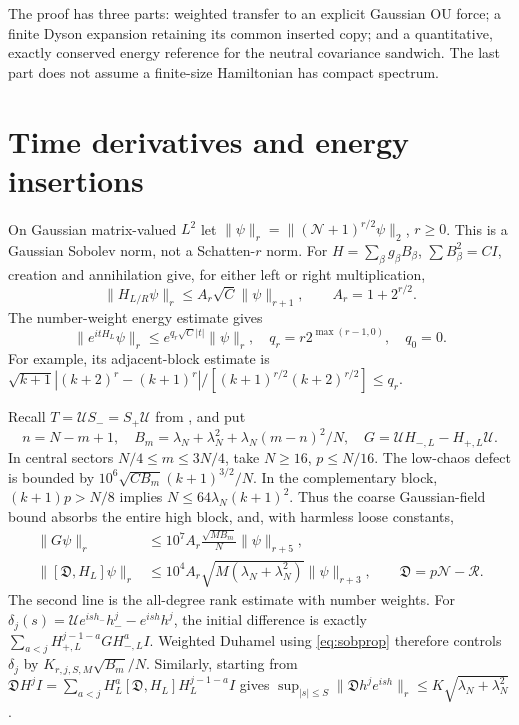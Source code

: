 \documentclass[11pt,a4paper]{article}
\newcommand{\NN}{\mathcal N}
\newcommand{\DD}{\mathfrak D}
\begin{document}
The proof has three parts: weighted transfer to an explicit Gaussian
OU force; a finite Dyson expansion retaining its common inserted copy;
and a quantitative, exactly conserved energy reference for the neutral
covariance sandwich. The last part does not assume a finite-size
Hamiltonian has compact spectrum.

\newpage
\section{Time derivatives and energy insertions}
On Gaussian matrix-valued $L^2$ let
$\|\psi\|_r=\|(\NN+1)^{r/2}\psi\|_2$, $r\ge0$. This is a
Gaussian Sobolev norm, not a Schatten-$r$ norm. For
$H=\sum_\beta g_\beta B_\beta$, $\sum B_\beta^2=CI$, creation and
annihilation give, for either left or right multiplication,
\begin{equation}
 \|H_{L/R}\psi\|_r\le A_r\sqrt C\|\psi\|_{r+1},\qquad
 A_r=1+2^{r/2}.
\end{equation}
The number-weight energy estimate gives
\begin{equation}
 \|e^{itH_L}\psi\|_r\le e^{q_r\sqrt C|t|}\|\psi\|_r,
 \quad q_r=r2^{\max(r-1,0)},\quad q_0=0.
 \label{eq:sobprop}
\end{equation}
For example, its adjacent-block estimate is
$\sqrt{k+1}|(k+2)^r-(k+1)^r|/
[(k+1)^{r/2}(k+2)^{r/2}]\le q_r$.

Recall $T=\mathcal U S_-=S_+\mathcal U$ from \cite{Transfer}, and put
\begin{equation}
 n=N-m+1,\quad B_m=\lambda_N+\lambda_N^2+
 \lambda_N(m-n)^2/N,\quad G=\mathcal U H_{-,L}-H_{+,L}\mathcal U.
\end{equation}
In central sectors $N/4\le m\le3N/4$, take $N\ge16$, $p\le N/16$.
The low-chaos defect is bounded by
$10^6\sqrt{CB_m}(k+1)^{3/2}/N$. In the complementary block,
$(k+1)p>N/8$ implies $N\le64\lambda_N(k+1)^2$.
Thus the coarse Gaussian-field bound absorbs the entire high block,
and, with harmless loose constants,
\begin{align}
 \|G\psi\|_r&\le10^7 A_r\frac{\sqrt{MB_m}}N\|\psi\|_{r+5},\\
 \|[\DD,H_L]\psi\|_r
 &\le10^4 A_r\sqrt{M(\lambda_N+\lambda_N^2)}\|\psi\|_{r+3},
 \qquad \DD=p\NN-\mathcal R.
 \label{eq:weightedcomm}
\end{align}
The second line is the all-degree rank estimate \cite{Rank} with
number weights. For $\delta_j(s)=\mathcal Ue^{ish_-}h_-^j-e^{ish}h^j$,
the initial difference is exactly
$\sum_{a<j}H_{+,L}^{j-1-a}G H_{-,L}^aI$.
Weighted Duhamel using \eqref{eq:sobprop} therefore controls
$\delta_j$ by $K_{r,j,S,M}\sqrt{B_m}/N$.
Similarly, starting from
$\DD H^jI=\sum_{a<j}H_L^a[\DD,H_L]H_L^{j-1-a}I$ gives
$\sup_{|s|\le S}\|\DD h^je^{ish}\|_r\le K\sqrt{\lambda_N+\lambda_N^2}$.
\end{document}
